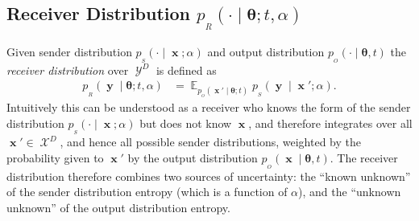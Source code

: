 \documentclass[11pt,table]{article}
\DeclareMathOperator*{\E}{\mathbb{E}}
\DeclareMathOperator{\x}{\mathbf{x}}
\DeclareMathOperator{\X}{\mathcal{X}}
\DeclareMathOperator{\y}{\mathbf{y}}
\DeclareMathOperator{\Y}{\mathcal{Y}}
\renewcommand{\vec}[1]{\boldsymbol{#1}}
\newcommand{\pars}{\theta}
\newcommand{\parsn}{\vec{\pars}}
\newcommand{\0}[1]{\constvec{0}{#1}}
\newcommand{\1}[1]{\constvec{1}{#1}}
\newcommand{\sender}[2]{p_{_S}\left(#1 \mid #2\right)}
\newcommand{\out}{p_{_O}}
\newcommand{\rec}{p_{_R}}
\begin{document}
\subsection{Receiver Distribution \texorpdfstring{$\rec(\cdot \mid \parsn; t, \alpha)$}{}}
Given sender distribution $\sender{\cdot}{\x; \alpha}$ and output distribution $\out(\cdot \mid \parsn, t)$ the \emph{receiver distribution} over $\Y^D$ is defined as
\begin{align}
\rec(\y \mid \parsn; t, \alpha) &= \E_{\out(\x' \mid \parsn; t)}\sender{\y}{\x'; \alpha}.\label{r_dist}
\end{align}
Intuitively this can be understood as a receiver who knows the form of the sender distribution $\sender{\cdot}{\x ; \alpha}$ but does not know $\x$, and therefore integrates over all $\x' \in \X^D$, and hence all possible sender distributions, weighted by the probability  given to $\x'$ by the output distribution $\out(\x \mid \parsn, t)$.
The receiver distribution therefore combines two sources of uncertainty: the ``known unknown'' of the sender distribution entropy (which is a function of $\alpha$), and the ``unknown unknown'' of the output distribution entropy.
\end{document}
